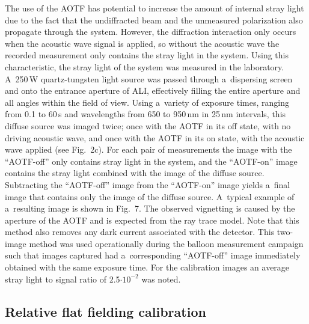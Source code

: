 \documentclass[amtd, online, hvmath]{copernicus}
\begin{document}
The use of the AOTF has potential to increase the amount of internal
stray light due to the fact that the undiffracted beam and the
unmeasured polarization also propagate through the system. However,
the diffraction interaction only occurs when the acoustic wave signal
is applied, so without the acoustic wave the recorded measurement only
contains the stray light in the system. Using this characteristic, the
stray light of the system was measured in the
laboratory. A~250\,\unit{W} quartz-tungsten light source was passed
through a~dispersing screen and onto the entrance aperture of ALI,
effectively filling the entire aperture and all angles within the
field of view. Using a~variety of exposure times, ranging from 0.1 to
60\,\unit{s} and wavelengths from 650 to 950\,\unit{nm} in
25\,\unit{nm} intervals, this diffuse source was imaged twice; once
with the AOTF in its off state, with no driving acoustic wave, and
once with the AOTF in its on state, with the acoustic wave applied
(see Fig.~2c). For each pair of measurements the image with the
``AOTF-off'' only contains stray light in the system, and the
``AOTF-on'' image contains the stray light combined with the image of
the diffuse source. Subtracting the ``AOTF-off'' image from the
``AOTF-on'' image yields a~final image that contains only the image of
the diffuse source. A~typical example of a~resulting image is shown in
Fig.~7. The observed vignetting is caused by the aperture of the AOTF
and is expected from the ray trace model. Note that this method also
removes any dark current associated with the detector. This two-image
method was used operationally during the balloon measurement campaign
such that images captured had a~corresponding ``AOTF-off'' image
immediately obtained with the same exposure time. For the calibration images an average stray light to signal ratio of 2.5$\cdot10^{-2}$ was noted.

\subsection{Relative flat fielding calibration}
\end{document}
